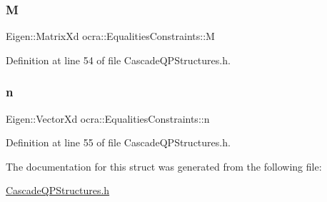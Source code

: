 \subsubsection{\texorpdfstring{M}{M}}
{\footnotesize\ttfamily Eigen\+::\+Matrix\+Xd ocra\+::\+Equalities\+Constraints\+::M}



Definition at line 54 of file Cascade\+Q\+P\+Structures.\+h.

\hypertarget{structocra_1_1EqualitiesConstraints_a03425f2d5d16dbb6a0c7da036a2fee77}{}\label{structocra_1_1EqualitiesConstraints_a03425f2d5d16dbb6a0c7da036a2fee77} 
\subsubsection{\texorpdfstring{n}{n}}
{\footnotesize\ttfamily Eigen\+::\+Vector\+Xd ocra\+::\+Equalities\+Constraints\+::n}



Definition at line 55 of file Cascade\+Q\+P\+Structures.\+h.



The documentation for this struct was generated from the following file\+:\begin{DoxyCompactItemize}
\item 
\hyperlink{CascadeQPStructures_8h}{Cascade\+Q\+P\+Structures.\+h}\end{DoxyCompactItemize}
